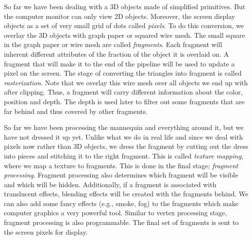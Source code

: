 \documentclass[12pt] {article}
\begin{document}
So far we have been dealing with a 3D objects made of simplified primitives. But the computer monitor can only view 2D objects. Moreover, the screen display objects as a set of very small grid of dots called \emph{pixels}. To do this conversion, we overlay the 3D objects with graph paper or squared wire mesh. The small square in the graph paper or wire mesh are called \emph{fragments}. Each fragment will inherent different attributes of the fraction of the object it is overlaid on. A fragment that will make it to the end of the pipeline will be used to update a pixel on the screen. The stage of converting the triangles into fragment is called \emph{rasterization}. Note that we overlay this wire mesh over all objects we end up with after clipping. Thus, a fragment will carry different information about the color, position and depth. The depth is used later to filter out some fragments that are far behind and thus covered by other fragments.
 
So far we have been processing the mannequin and everything around it, but we have not dressed it up yet. Unlike what we do in real life and since we deal with pixels now rather than 3D objects, we dress the fragment by cutting out the dress into pieces and stitching it to the right fragment. This is called \emph{texture mapping}, where we map a texture to fragments. This is done in the final stage; \emph{fragment processing}. Fragment processing also determines which fragment will be visible and which will be hidden. Additionally, if a fragment is associated with translucent effects, blending effects will be created with the fragments behind. We can also add some fancy effects (e.g., smoke, fog) to the fragments which make computer graphics a very powerful tool. Similar to vertex processing stage, fragment processing is also programmable. The final set of fragments is sent to the screen pixels for display. 





\end{document}
